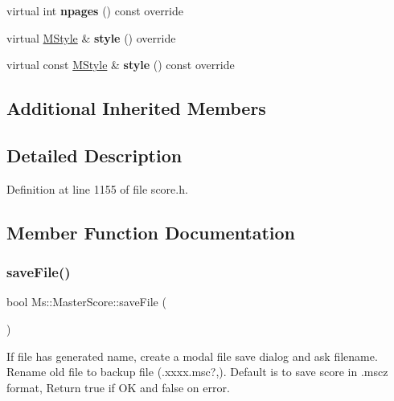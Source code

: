 \begin{DoxyCompactItemize}
\item 
\mbox{\label{class_ms_1_1_master_score_ace3c07c2bb220563663c7b411697763b}} 
virtual int {\bfseries npages} () const override
\item 
\mbox{\label{class_ms_1_1_master_score_a03f9af0ba12ddf29071716d800cea0c6}} 
virtual \hyperlink{class_ms_1_1_m_style}{M\+Style} \& {\bfseries style} () override
\item 
\mbox{\label{class_ms_1_1_master_score_a3af67842905f3f7ab3b326d303bf1d39}} 
virtual const \hyperlink{class_ms_1_1_m_style}{M\+Style} \& {\bfseries style} () const override
\end{DoxyCompactItemize}
\subsection*{Additional Inherited Members}


\subsection{Detailed Description}


Definition at line 1155 of file score.\+h.



\subsection{Member Function Documentation}
\mbox{\label{class_ms_1_1_master_score_abaf1b1c61767ee8e0c72b825d97749d8}} 
\subsubsection{\texorpdfstring{save\+File()}{saveFile()}}
{\footnotesize\ttfamily bool Ms\+::\+Master\+Score\+::save\+File (\begin{DoxyParamCaption}{ }\end{DoxyParamCaption})}

If file has generated name, create a modal file save dialog and ask filename. Rename old file to backup file (.xxxx.\+msc?,). Default is to save score in .mscz format, Return true if OK and false on error. 

